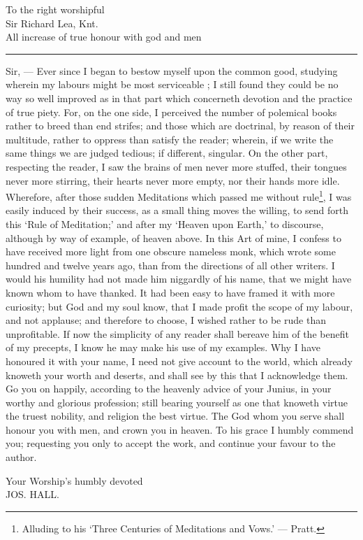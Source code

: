 \begin{center}
    To the right worshipful\\Sir Richard Lea, Knt.\\All increase of true honour with god and men
    \end{center}
    \vspace{5pt}
    \hrule
    \vspace{6pt}
    Sir, --- Ever since I began to bestow myself upon the common good, studying wherein my labours might be most serviceable ; I still found they could be no way so well improved as in that part which concerneth devotion and the practice of true piety. For, on the one side, I perceived the number of polemical books rather to breed than end strifes; and those which are doctrinal, by reason of their multitude, rather to oppress than satisfy the reader; wherein, if we write the same things we are judged tedious; if different, singular. On the other part, respecting the reader, I saw the brains of men never more stuffed, their tongues never more stirring, their hearts never more empty, nor their hands more idle. Wherefore, after those sudden Meditations which passed me without rule\footnote{Alluding to his `Three Centuries of Meditations and Vows.' — Pratt.}, I was easily induced by their success, as a small thing moves the willing, to send forth this `Rule of Meditation;' and after my `Heaven upon Earth,' to discourse, although by way of example, of heaven above. In this Art of mine, I confess to have received more light from one obscure nameless monk, which wrote some hundred and twelve years ago, than from the directions of all other writers. I would his humility had not made him niggardly of his name, that we might have known whom to have thanked. It had been easy to have framed it with more curiosity; but God and my soul know, that I made profit the scope of my labour, and not applause; and therefore to choose, I wished rather to be rude than unprofitable. If now the simplicity of any reader shall bereave him of the benefit of my precepts, I know he may make his use of my examples. Why I have honoured it with your name, I need not give account to the world, which already knoweth your worth and deserts, and shall see by this that I acknowledge them. Go you on happily, according to the heavenly advice of your Junius, in your worthy and glorious profession; still bearing yourself as one that knoweth virtue the truest nobility, and religion the best virtue. The God whom you serve shall honour you with men, and crown you in heaven. To his grace I humbly commend you; requesting you only to accept the work, and continue your favour to the author. 
    \begin{flushright}
    Your Worship's humbly devoted\\\uppercase{Jos. Hall.}
    \end{flushright}    
    